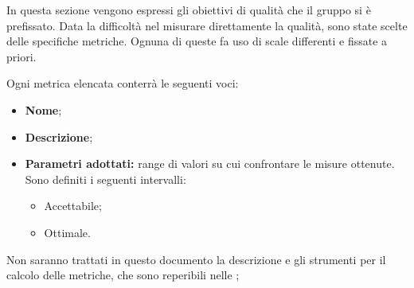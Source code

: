 In questa sezione vengono espressi gli obiettivi di qualità che il gruppo \gruppo \space  si è prefissato. Data la difficoltà nel misurare direttamente la qualità, sono state scelte delle specifiche metriche. Ognuna di queste fa uso di scale differenti e fissate a
priori.

Ogni metrica elencata conterrà le seguenti voci:
\begin{itemize}
	\item \textbf{Nome};
	\item \textbf{Descrizione};
	\item \textbf{Parametri adottati: }range di valori su cui confrontare le misure ottenute. Sono definiti i seguenti intervalli:
	\begin{itemize}
		\item Accettabile;
		\item Ottimale.
	\end{itemize}		
	
\end{itemize}

Non saranno trattati in questo documento la descrizione e gli strumenti per il calcolo delle metriche, che sono reperibili nelle \NdP ;
